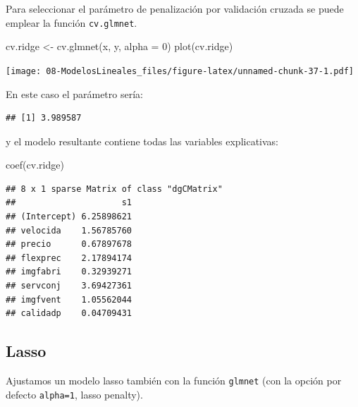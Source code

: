 \documentclass[
]{book}
\newenvironment{Shaded}{\begin{snugshade}}{\end{snugshade}}
\newcommand{\AttributeTok}[1]{\textcolor[rgb]{0.77,0.63,0.00}{#1}}
\newcommand{\DecValTok}[1]{\textcolor[rgb]{0.00,0.00,0.81}{#1}}
\newcommand{\FloatTok}[1]{\textcolor[rgb]{0.00,0.00,0.81}{#1}}
\newcommand{\FunctionTok}[1]{\textcolor[rgb]{0.00,0.00,0.00}{#1}}
\newcommand{\NormalTok}[1]{#1}
\newcommand{\OtherTok}[1]{\textcolor[rgb]{0.56,0.35,0.01}{#1}}
\newcommand{\SpecialCharTok}[1]{\textcolor[rgb]{0.00,0.00,0.00}{#1}}
\theoremstyle{break}
\theoremstyle{nonumberplain}
\begin{document}
Para seleccionar el parámetro de penalización por validación cruzada se puede emplear
la función \texttt{cv.glmnet}.

\begin{Shaded}
\begin{Highlighting}[]
\NormalTok{cv.ridge }\OtherTok{\textless{}{-}} \FunctionTok{cv.glmnet}\NormalTok{(x, y, }\AttributeTok{alpha =} \DecValTok{0}\NormalTok{)}
\FunctionTok{plot}\NormalTok{(cv.ridge)}
\end{Highlighting}
\end{Shaded}

\texttt{[image: 08-ModelosLineales\_files/figure-latex/unnamed-chunk-37-1.pdf]}

En este caso el parámetro sería:

\begin{Shaded}
\end{Shaded}

\begin{verbatim}
## [1] 3.989587
\end{verbatim}

y el modelo resultante contiene todas las variables explicativas:

\begin{Shaded}
\begin{Highlighting}[]
\FunctionTok{coef}\NormalTok{(cv.ridge)}
\end{Highlighting}
\end{Shaded}

\begin{verbatim}
## 8 x 1 sparse Matrix of class "dgCMatrix"
##                     s1
## (Intercept) 6.25898621
## velocida    1.56785760
## precio      0.67897678
## flexprec    2.17894174
## imgfabri    0.32939271
## servconj    3.69427361
## imgfvent    1.05562044
## calidadp    0.04709431
\end{verbatim}

\hypertarget{lasso}{%
\subsection{Lasso}\label{lasso}}

Ajustamos un modelo lasso también con la función \texttt{glmnet} (con la opción por defecto \texttt{alpha=1}, lasso penalty).
\end{document}
